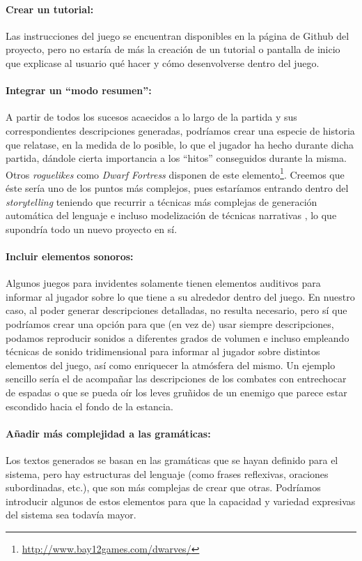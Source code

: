 \paragraph{Crear un tutorial:} Las instrucciones del juego se encuentran disponibles en la página de Github del proyecto, pero no estaría de más la creación de un tutorial o pantalla de inicio que explicase al usuario qué hacer y cómo desenvolverse dentro del juego.

\paragraph{Integrar un ``modo resumen'':} A partir de todos los sucesos acaecidos a lo largo de la partida y sus correspondientes descripciones generadas, podríamos crear una especie de historia que relatase, en la medida de lo posible, lo que el jugador ha hecho durante dicha partida, dándole cierta importancia a los ``hitos'' conseguidos durante la misma. Otros \textit{roguelikes} como \textit{Dwarf Fortress} disponen de este elemento\footnote{\url{http://www.bay12games.com/dwarves/}}. Creemos que éste sería uno de los puntos más complejos, pues estaríamos entrando dentro del \emph{storytelling}\cite{Salen_and_Zimmerman_2004a_ch26} teniendo que recurrir a técnicas más complejas de generación automática del lenguaje\cite{Reiter_and_Dale_2000b} e incluso modelización de técnicas narrativas \cite{Mani2012a}, lo que supondría todo un nuevo proyecto en sí.

\paragraph{Incluir elementos sonoros:} Algunos juegos para invidentes solamente tienen elementos auditivos para informar al jugador sobre lo que tiene a su alrededor dentro del juego. En nuestro caso, al poder generar descripciones detalladas, no resulta necesario, pero sí que podríamos crear una opción para que (en vez de) usar siempre descripciones, podamos reproducir sonidos a diferentes grados de volumen e incluso empleando técnicas de sonido tridimensional para informar al jugador sobre distintos elementos del juego, así como enriquecer la atmósfera del mismo. Un ejemplo sencillo sería el de acompañar las descripciones de los combates con entrechocar de espadas o que se pueda oír los leves gruñidos de un enemigo que parece estar escondido hacia el fondo de la estancia.

\paragraph{Añadir más complejidad a las gramáticas:} Los textos generados se basan en las gramáticas que se hayan definido para el sistema, pero hay estructuras del lenguaje (como frases reflexivas, oraciones subordinadas, etc.), que son más complejas de crear que otras. Podríamos introducir algunos de estos elementos para que la capacidad y variedad expresivas del sistema sea todavía mayor. 


